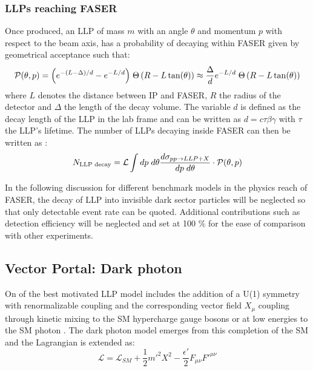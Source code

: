 		\subsubsection{LLPs reaching FASER}
		Once produced, an LLP of mass $m$  with an angle $\theta$ and momentum $p$ with respect to the beam axis, has a probability of decaying within FASER given by geometrical acceptance such that: 
		\begin{equation}
			\mathcal{P}(\theta, p) = {\left( e^{-(L-\Delta)/d} - e^{-L/d}\right)} \hspace{1mm} \Theta \left(R-L\tan(\theta)\right) \approx \frac{\Delta}{d}e^{-L/d} \hspace{1mm} \Theta \left(R-L\tan(\theta)\right)
		\end{equation}
		where $L$ denotes the distance between IP and FASER, $R$ the radius of the detector and $\Delta$ the length of the decay volume. The variable $d$ is defined as the decay length of the LLP in the lab frame and can be written as $d = c \tau \beta \gamma$ with $\tau$ the LLP's lifetime. The number of LLPs decaying inside FASER can then be written as \cite{FASER_LLP}: 
		\begin{equation}
			N_{\text{LLP decay}} = \mathcal{L} \int dp \hspace{1mm} d\theta \frac{d\sigma_{pp \rightarrow LLP + X}}{dp \hspace{1mm} d\theta} \cdot \mathcal{P}(\theta, p)
		\end{equation}
		
		In the following discussion for different benchmark models in the physics reach of FASER, the decay of LLP into invisible dark sector particles will be neglected so that only detectable event rate can be quoted. Additional contributions such as detection efficiency will be neglected and set at 100 \% for the ease of comparison with other experiments. 
		
		
		\subsection{Vector Portal: Dark photon}
		On of the best motivated LLP model includes the addition of a U(1) symmetry with renormalizable coupling and the corresponding vector field $X_\mu$ coupling through kinetic mixing to the SM hypercharge gauge bosons  or at low energies to the SM photon \cite{FASER_LLP}. The dark photon model emerges from this completion of the SM and the Lagrangian is extended as: 
		\begin{equation}
			\mathcal{L} = \mathcal{L}_{SM} + \frac{1}{2} m'^2X^2 - \frac{\epsilon'}{2}F_{\mu \nu}F'^{\mu \nu}
		\end{equation} 
		
